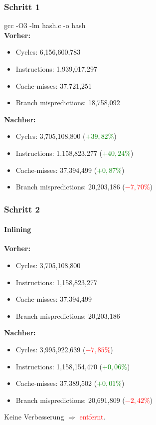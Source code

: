 \documentclass{beamer}
\newcommand{\success}[1]{\textcolor{green}{#1}}
\newcommand{\fail}[1]{\textcolor{red}{#1}}
\begin{document}
  \begin{frame}
  	\frametitle{Schritt 1}
  	gcc -O3 -lm hash.c -o hash\\[1em]
  	\textbf{Vorher:}
  	\begin{itemize}
			\item Cycles: 6,156,600,783\\
			\item Instructions: 1,939,017,297\\
			\item Cache-misses: 37,721,251\\
			\item Branch mispredictions: 18,758,092\\
		\end{itemize}

		\textbf{Nachher:}
  	\begin{itemize}
			\item Cycles: 3,705,108,800 (\success{$+ 39,82 \%$})\\
			\item Instructions: 1,158,823,277 (\success{$+ 40,24 \%$})\\
			\item Cache-misses: 37,394,499 (\success{$+ 0,87 \%$})\\
			\item Branch mispredictions: 20,203,186 (\fail{$- 7,70 \%$})\\
		\end{itemize}
  \end{frame}

  \begin{frame}
  	\frametitle{Schritt 2}
		\framesubtitle{Inlining}
  	\textbf{Vorher:}
  	\begin{itemize}
			\item Cycles: 3,705,108,800 \\
			\item Instructions: 1,158,823,277\\
			\item Cache-misses: 37,394,499\\
			\item Branch mispredictions: 20,203,186\\
		\end{itemize}

		\textbf{Nachher:}
  	\begin{itemize}
			\item Cycles: 3,995,922,639 (\fail{$- 7,85 \%$})\\
			\item Instructions:  1,158,154,470 (\success{$+ 0,06 \%$})\\
			\item Cache-misses: 37,389,502 (\success{$+ 0,01 \%$})\\
			\item Branch mispredictions: 20,691,809 (\fail{$- 2,42 \%$})\\
		\end{itemize}
		Keine Verbesserung $\Rightarrow$ \fail{entfernt}.
  \end{frame}
\end{document}

